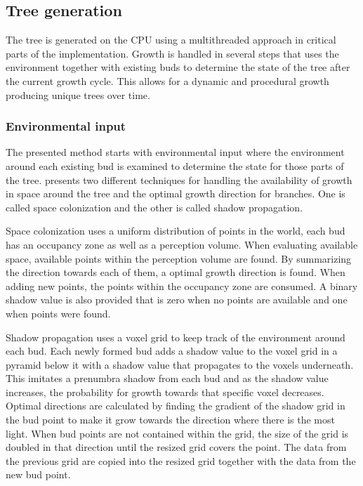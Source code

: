 \documentclass[11pt]{article} %
\begin{document}
\subsection{Tree generation}
The tree is generated on the CPU using a multithreaded approach in critical parts of the implementation.
Growth is handled in several steps that uses the environment together with existing buds to determine the state of the tree after the current growth cycle.
This allows for a dynamic and procedural growth producing unique trees over time.

\subsubsection{Environmental input}
The presented method starts with environmental input where the environment around each existing bud is examined to determine the state for those parts of the tree.
\citet{Palubicki:2009:STM:1531326.1531364} presents two different techniques for handling the availability of growth in space around the tree and the optimal growth direction for branches.
One is called space colonization and the other is called shadow propagation.

Space colonization uses a uniform distribution of points in the world, each bud has an occupancy zone as well as a perception volume.
When evaluating available space, available points within the perception volume are found.
By summarizing the direction towards each of them, a optimal growth direction is found.
When adding new points, the points within the occupancy zone are consumed.
A binary shadow value is also provided that is zero when no points are available and one when points were found.

Shadow propagation uses a voxel grid to keep track of the environment around each bud.
Each newly formed bud adds a shadow value to the voxel grid in a pyramid below it with a shadow value that propagates to the voxels underneath.
This imitates a prenumbra shadow from each bud and as the shadow value increases, the probability for growth towards that specific voxel decreases.
Optimal directions are calculated by finding the gradient of the shadow grid in the bud point to make it grow towards the direction where there is the most light.
When bud points are not contained within the grid, the size of the grid is doubled in that direction until the resized grid covers the point.
The data from the previous grid are copied into the resized grid together with the data from the new bud point.
\end{document}
